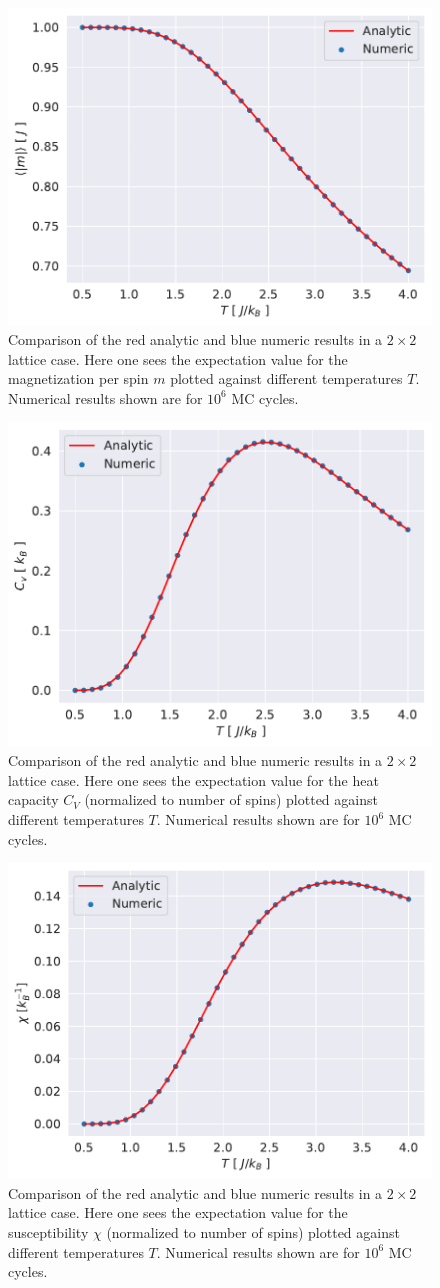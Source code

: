 \documentclass[english,notitlepage,reprint,nofootinbib]{revtex4-1}  %
\begin{document}
\begin{figure}[H]
    \centering
    \includegraphics[width=.5\textwidth]{../figures/numeric_analytic_m_T.pdf}
    \caption{Comparison of the red analytic and blue numeric results in a $2\times2$ lattice case. Here one sees the expectation value for the magnetization per spin $m$ plotted against different temperatures $T$. Numerical results shown are for $10^6$ MC cycles.}
    \label{fig:numeric_analytic_m_T}
\end{figure}

\begin{figure}[H]
    \centering
    \includegraphics[width=.5\textwidth]{../figures/numeric_analytic_c_v_T.pdf}
    \caption{Comparison of the red analytic and blue numeric results in a $2\times2$ lattice case. Here one sees the expectation value for the heat capacity $C_V$ (normalized to number of spins) plotted against different temperatures $T$. Numerical results shown are for $10^6$ MC cycles.}
    \label{fig:numeric_analytic_c_v_T}
\end{figure}

\begin{figure}[H]
    \centering
    \includegraphics[width=.5\textwidth]{../figures/numeric_analytic_X_T.pdf}
    \caption{Comparison of the red analytic and blue numeric results in a $2\times2$ lattice case. Here one sees the expectation value for the susceptibility $\chi$ (normalized to number of spins) plotted against different temperatures $T$. Numerical results shown are for $10^6$ MC cycles.}
    \label{fig:numeric_analytic_X_T}
\end{figure}
\end{document}
